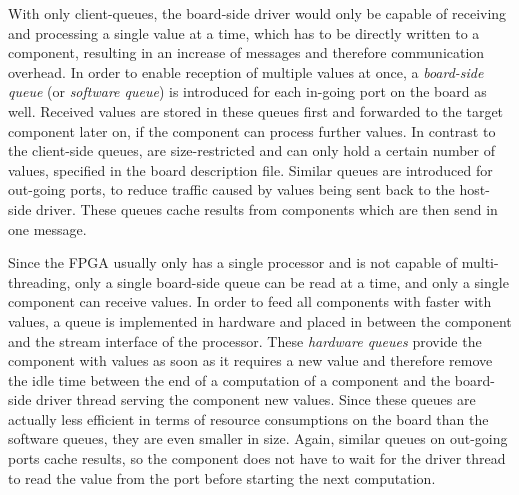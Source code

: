 \documentclass{report}
\begin{document}
With only client-queues, the board-side driver would only be capable of receiving and processing a single value at a time, which has to be directly written to a component, resulting in an increase of messages and therefore communication overhead. In order to enable reception of multiple values at once, a \textit{board-side queue} (or \textit{software queue}) is introduced for each in-going port on the board as well. Received values are stored in these queues first and forwarded to the target component later on, if the component can process further values. In contrast to the client-side queues, are size-restricted and can only hold a certain number of values, specified in the board description file.
Similar queues are introduced for out-going ports, to reduce traffic caused by values being sent back to the host-side driver. These queues cache results from components which are then send in one message.

Since the FPGA usually only has a single processor and is not capable of multi-threading, only a single board-side queue can be read at a time, and only a single component can receive values. In order to feed all components with faster with values, a queue is implemented in hardware and placed in between the component and the stream interface of the processor. These \textit{hardware queues} provide the component with values as soon as it requires a new value and therefore remove the idle time between the end of a computation of a component and the board-side driver thread serving the component new values. Since these queues are actually less efficient in terms of resource consumptions on the board than the software queues, they are even smaller in size. Again, similar queues on out-going ports cache results, so the component does not have to wait for the driver thread to read the value from the port before starting the next computation.
\end{document}
